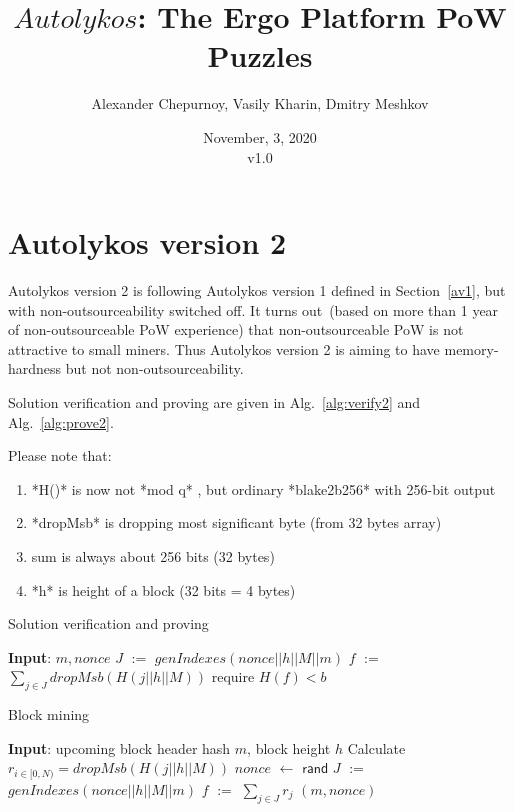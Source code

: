 \documentclass[]{article}
\newcommand{\Name}{$Autolykos$}
\def\Let#1#2{\State #1 $:=$ #2}
\def\LetRnd#1#2{\State #1 $\gets$ #2}
\begin{document}
    \title{\Name: The Ergo Platform PoW Puzzles}

    \author{Alexander Chepurnoy, Vasily Kharin, Dmitry Meshkov}

    \date{November, 3, 2020\\v1.0}
    \maketitle

    \section{Autolykos version 2}

    Autolykos version 2 is following Autolykos version 1 defined in Section~\ref{av1}, but with non-outsourceability 
    switched off. It turns out~(based on more than 1 year of non-outsourceable PoW experience) that non-outsourceable 
    PoW is not attractive to small miners. Thus Autolykos version 2 is aiming to have memory-hardness but not non-outsourceability.

    
    Solution verification and proving are given in Alg.~\ref{alg:verify2} and Alg.~\ref{alg:prove2}.

    Please note that:
    \begin{enumerate}
        \item{} *H()* is now not *mod q* , but ordinary *blake2b256* with 256-bit output
        \item{} *dropMsb* is dropping most significant byte (from 32 bytes array)
        \item{} sum is always about 256 bits (32 bytes)
        \item{} *h* is height of a block (32 bits = 4 bytes)
    \end{enumerate} 

    \begin{algorithm}[H]
        \caption{Solution verification and proving}
        \label{alg:verify2}
        \begin{algorithmic}[1]
            \State \textbf{Input}: $m, nonce$
            \Let{$J$}{$genIndexes(nonce || h || M || m)$}
            \Let{$f$}{$\sum_{j \in J} dropMsb(H(j || h || M))$}
            \State require $H(f) < b$
        \end{algorithmic}
    \end{algorithm}

    \begin{algorithm}[H]
        \caption{Block mining}
        \label{alg:prove2}
        \begin{algorithmic}[1]
            \State \textbf{Input}: upcoming block header hash $m$, block height $h$
            \State Calculate $r_{i \in [0,N)} = dropMsb(H(j || h || M))$
            \LetRnd{$nonce$}{$\mathsf{rand}$}
            \Let{$J$}{$genIndexes(nonce || h || M || m)$}
            \Let{$f$}{$\sum_{j \in J}{r_j}$}
            \State \Return $(m, nonce)$
            \EndIf
            \EndWhile
        \end{algorithmic}
    \end{algorithm}
\end{document}
